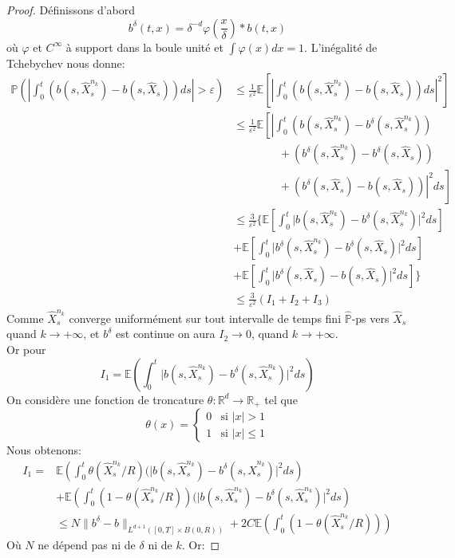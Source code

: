 \documentclass[A4paper,12pt]{report}
\newcommand{\R}{{\mathbb{R}}}
\newcommand{\E}{{\mathbb{E}}}
\newcommand{\pr}{{\mathbb{P}}}
\begin{document}
\begin{proof}
Définissons d'abord $$b^{\delta} (t,x) = \delta^{-d} \varphi(\frac{x}{\delta})*b(t,x) $$ où $\varphi$ et $C^{\infty}$ à support dans la boule unité et $\int \varphi(x)dx =1$.
L'inégalité de Tchebychev nous donne:
\begin{align*}
\pr\left( \left| \int_0 ^t (b(s, \widehat{X}_{s}^{n_{k}})- b(s, \widehat{X}_{s})) ds \right| > \varepsilon\right) &\leq \frac{1}{\varepsilon^2} \E \left[ \left| \int_0 ^t (b(s, \widehat{X}_{s}^{n_{k}})- b(s, \widehat{X}_{s}))ds \right|^2 \right]\\
&\leq \frac{1}{\varepsilon^2} \E \left[ \left| \int_0 ^t (b(s, \widehat{X}_{s}^{n_{k}})-b^{\delta}(s, \widehat{X}_{s}^{n_{k}})) \right. \right. \\
&\phantom{\leq \frac{1}{\varepsilon^2} \E \left[ \right]} + \left. \left. (b^{\delta}(s, \widehat{X}_{s} ^{n_{k}}) - b^{\delta}(s, \widehat{X}_{s})) \right. \right. \\
&\phantom{\leq \frac{1}{\varepsilon^2} \E \left[ \right]} + \left. \left. (b^{\delta}(s, \widehat{X}_{s}) - b(s, \widehat{X}_{s})) \right|^2  ds \right] \\
& \leq \frac{3}{\varepsilon^2} \lbrace \E \left[ \int_0 ^t \rvert b(s, \widehat{X}_{s}^{n_{k}})-b^{\delta}(s, \widehat{X}_{s}^{n_{k}}) \rvert^2 ds \right]\\
& + \E \left[ \int_0 ^t \lvert b^{\delta}(s, \widehat{X}_{s} ^{n_{k}}) - b^{\delta}(s, \widehat{X}_{s}) \rvert^2 ds \right]\\
& + \E \left[ \int_0 ^t \lvert b^{\delta}(s, \widehat{X}_{s}) - b(s, \widehat{X}_{s}) \rvert^2 ds \right]\rbrace\\
&\leq \frac{3}{\varepsilon^2} ( I_1 + I_2 + I_3)
\end{align*}
Comme $\widehat{X}_{s} ^{n_{k}}$ converge uniformément sur tout intervalle de temps fini $\widehat{\pr}$-ps vers $\widehat{X}_{s} $ quand $k \longrightarrow + \infty$, et $b^{\delta}$ est continue on aura $I_2 \longrightarrow 0 $, quand $k \longrightarrow +\infty$.\\
Or pour $$I_1 = \E \left( \int_0 ^t \rvert b(s, \widehat{X}_{s}^{n_{k}})-b^{\delta}(s, \widehat{X}_{s}^{n_{k}}) \rvert^2 ds \right)$$ 
On considère une fonction de troncature $\theta : \R^d \longrightarrow \R_+$ tel que 
$$
\theta(x) = \left\{
    \begin{array}{ll}
        0 & \mbox{si } \lvert x \rvert > 1\\
        1 & \mbox{si }  \lvert x \rvert \leq 1
    \end{array}
\right.
$$
Nous obtenons:
\begin{align*}
I_1 = &\E \left( \int_0 ^t \theta(\widehat{X}_{s}^{n_{k}}/R)(\rvert b(s, \widehat{X}_{s}^{n_{k}})-b^{\delta}(s, \widehat{X}_{s}^{n_{k}}) \rvert^2 ds \right)\\ 
&+ \E \left( \int_0 ^t (1-\theta(\widehat{X}_{s}^{n_{k}}/R))(\rvert b(s, \widehat{X}_{s}^{n_{k}})-b^{\delta}(s, \widehat{X}_{s}^{n_{k}}) \rvert^2 ds \right)\\
& \leq N \parallel b^{\delta}- b \parallel_{L^{d+1} ([0, T]\times B(0, R))} +2C \E \left( \int_0 ^t (1-\theta(\widehat{X}_{s}^{n_{k}}/R))\right)
\end{align*}
Où $N$ ne dépend pas ni de $\delta$ ni de $k$. Or:


\end{proof}
\end{document}
